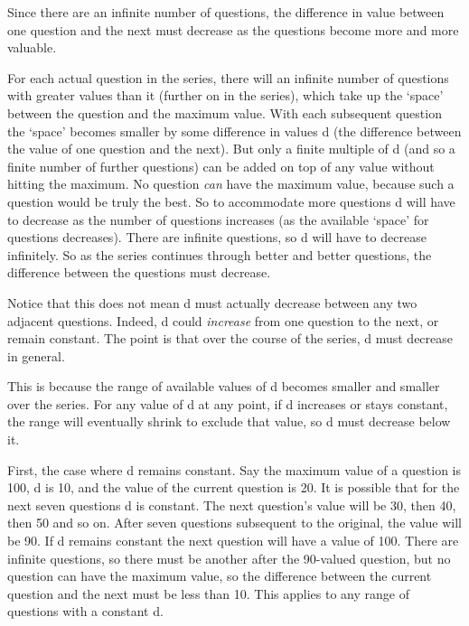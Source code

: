 Since there are an infinite number of questions, the difference in value between one question and the next must decrease as the questions become more and more valuable.

For each actual question in the series, there will an infinite number of questions with greater values than it (further on in the series), which take up the `space' between the question and the maximum value.
With each subsequent question the `space' becomes smaller by some difference in values d (the difference between the value of one question and the next).
But only a finite multiple of d (and so a finite number of further questions) can be added on top of any value without hitting the maximum.
No question \emph{can} have the maximum value, because such a question would be truly the best.
So to accommodate more questions d will have to decrease as the number of questions increases (as the available `space' for questions decreases).
There are infinite questions, so d will have to decrease infinitely.
So as the series continues through better and better questions, the difference between the questions must decrease.

Notice that this does not mean d must actually decrease between any two adjacent questions.
Indeed, d could \emph{increase} from one question to the next, or remain constant.
The point is that over the course of the series, d must decrease in general.

This is because the range of available values of d becomes smaller and smaller over the series.
For any value of d at any point, if d increases or stays constant, the range will eventually shrink to exclude that value, so d must decrease below it.

First, the case where d remains constant.
Say the maximum value of a question is 100, d is 10, and the value of the current question is 20.
It is possible that for the next seven questions d is constant.
The next question's value will be 30, then 40, then 50 and so on.
After seven questions subsequent to the original, the value will be 90.
If d remains constant the next question will have a value of 100.
There are infinite questions, so there must be another after the 90-valued question, but no question can have the maximum value, so the difference between the current question and the next must be less than 10.
This applies to any range of questions with a constant d.

